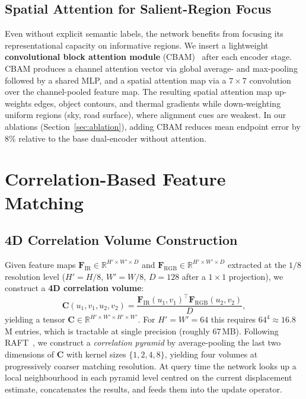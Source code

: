 \subsection{Spatial Attention for Salient-Region Focus}
\label{subsec:attention}

Even without explicit semantic labels, the network benefits from focusing
its representational capacity on informative regions.  We insert a
lightweight \textbf{convolutional block attention module}
(CBAM)~\cite{woo2018cbam} after each encoder stage.  CBAM produces a
channel attention vector via global average- and max-pooling followed by a
shared MLP, and a spatial attention map via a $7 \times 7$ convolution
over the channel-pooled feature map.  The resulting spatial attention map
up-weights edges, object contours, and thermal gradients while
down-weighting uniform regions (sky, road surface), where alignment cues
are weakest.  In our ablations (Section~\ref{sec:ablation}), adding CBAM
reduces mean endpoint error by 8\% relative to the base dual-encoder
without attention.

\section{Correlation-Based Feature Matching}
\label{sec:correlation}

\subsection{4D Correlation Volume Construction}
\label{subsec:corr_volume}

Given feature maps $\mathbf{F}_{\mathrm{IR}} \in \mathbb{R}^{H' \times
W' \times D}$ and $\mathbf{F}_{\mathrm{RGB}} \in \mathbb{R}^{H' \times
W' \times D}$ extracted at the $1/8$ resolution level ($H' = H/8$,
$W' = W/8$, $D = 128$ after a $1 \times 1$ projection), we construct a
\textbf{4D correlation volume}:
\begin{equation}
  \mathbf{C}(u_1, v_1, u_2, v_2)
    = \frac{
        \mathbf{F}_{\mathrm{IR}}(u_1, v_1)^{\!\top}
        \mathbf{F}_{\mathrm{RGB}}(u_2, v_2)
      }{D},
  \label{eq:corr_volume}
\end{equation}
yielding a tensor $\mathbf{C} \in \mathbb{R}^{H' \times W' \times H'
\times W'}$.  For $H'{=}W'{=}64$ this requires $64^4 \approx 16.8$\,M
entries, which is tractable at single precision (roughly 67\,MB).
Following RAFT~\cite{teed2020raft}, we construct a \emph{correlation
pyramid} by average-pooling the last two dimensions of $\mathbf{C}$ with
kernel sizes $\{1, 2, 4, 8\}$, yielding four volumes at progressively
coarser matching resolution.  At query time the network looks up a local
neighbourhood in each pyramid level centred on the current displacement
estimate, concatenates the results, and feeds them into the update
operator.


